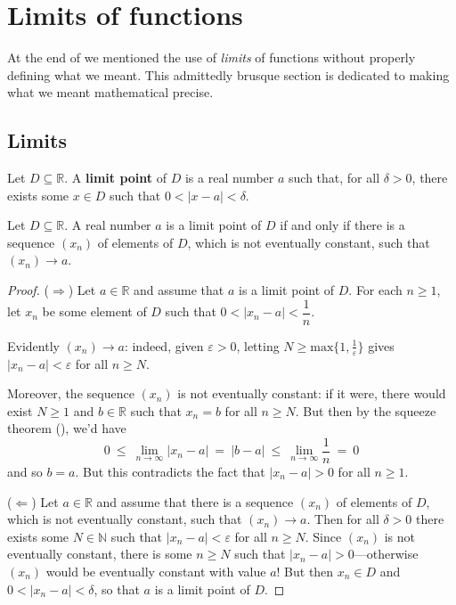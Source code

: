 \section{Limits of functions}

At the end of  we mentioned the use of \textit{limits} of functions without properly defining what we meant. This admittedly brusque section is dedicated to making what we meant mathematical precise.

\subsection*{Limits}

\begin{definition}
\label{defLimitPoint}
Let $D \subseteq \mathbb{R}$. A \textbf{limit point} of $D$ is a real number $a$ such that, for all $\delta > 0$, there exists some $x \in D$ such that $0 < |x-a| < \delta$.
\end{definition}

\begin{lemma}
Let $D \subseteq \mathbb{R}$. A real number $a$ is a limit point of $D$ if and only if there is a sequence $(x_n)$ of elements of $D$, which is not eventually constant, such that $(x_n) \to a$.
\end{lemma}

\begin{proof}
($\Rightarrow$) Let $a \in \mathbb{R}$ and assume that $a$ is a limit point of $D$. For each $n \ge 1$, let $x_n$ be some element of $D$ such that $0 < |x_n-a| < \dfrac{1}{n}$.

Evidently $(x_n) \to a$: indeed, given $\varepsilon > 0$, letting $N \ge \mathrm{max} \{ 1, \frac{1}{\varepsilon} \}$ gives $|x_n-a| < \varepsilon$ for all $n \ge N$.

Moreover, the sequence $(x_n)$ is not eventually constant: if it were, there would exist $N \ge 1$ and $b \in \mathbb{R}$ such that $x_n=b$ for all $n \ge N$. But then by the squeeze theorem (), we'd have
\[ 0 ~\le~ \lim_{n \to \infty} |x_n-a| ~=~ |b-a| ~\le~ \lim_{n \to \infty} \dfrac{1}{n} ~=~ 0 \]
and so $b=a$. But this contradicts the fact that $|x_n-a| > 0$ for all $n \ge 1$.

($\Leftarrow$) Let $a \in \mathbb{R}$ and assume that there is a sequence $(x_n)$ of elements of $D$, which is not eventually constant, such that $(x_n) \to a$. Then for all $\delta > 0$ there exists some $N \in \mathbb{N}$ such that $|x_n-a| < \varepsilon$ for all $n \ge N$. Since $(x_n)$ is not eventually constant, there is some $n \ge N$ such that $|x_n-a| > 0$---otherwise $(x_n)$ would be eventually constant with value $a$! But then $x_n \in D$ and $0 < |x_n-a| < \delta$, so that $a$ is a limit point of $D$.
\end{proof}

